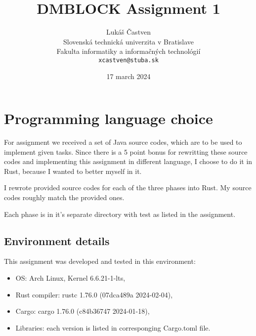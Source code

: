\documentclass[11pt,a4paper]{article}
\title{DMBLOCK Assignment 1}
\author{Lukáš Častven\\[2pt]
	{\small Slovenská technická univerzita v Bratislave}\\
	{\small Fakulta informatiky a informačných technológií}\\
	{\small \texttt{xcastven@stuba.sk}}
	}
\date{\small 17 march 2024}
\begin{document}
\pagestyle{plain}

\maketitle
\tableofcontents
\pagebreak

\section{Programming language choice}

For assignment we received a set of Java source codes, which are to be used
to implement given tasks. Since there is a 5 point bonus for rewritting these
source codes and implementing this assignment in different language, I choose
to do it in Rust\cite{rustlangRustProgramming}, because I wanted to better myself in it.

I rewrote provided source codes for each of the three phases into Rust. My source
codes roughly match the provided ones.

Each phase is in it's separate directory with test as listed in the assignment.

\subsection{Environment details}

This assignment was developed and tested in this environment:

\begin{itemize}
    \item OS: Arch Linux, Kernel 6.6.21-1-lts,
    \item Rust compiler: rustc 1.76.0 (07dca489a 2024-02-04),
    \item Cargo: cargo 1.76.0 (c84b36747 2024-01-18),
    \item Libraries: each version is listed in corresponging Cargo.toml file.
\end{itemize}







\end{document}

